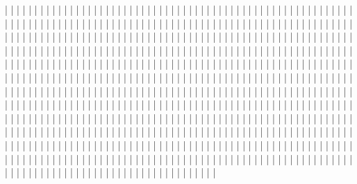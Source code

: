 |    |
|    |
|    |
|    |
|    |
|    |
|    |
|    |
|    |
|    |
|    |
|    |
|    |
|    |
|    |
|    |
|    |
|    |
|    |
|    |
|    |
|    |
|    |
|    |
|    |
|    |
|    |
|    |
|    |
|    |
|    |
|    |
|    |
|    |
|    |
|    |
|    |
|    |
|    |
|    |
|    |
|    |
|    |
|    |
|    |
|    |
|    |
|    |
|    |
|    |
|    |
|    |
|    |
|    |
|    |
|    |
|    |
|    |
|    |
|    |
|    |
|    |
|    |
|    |
|    |
|    |
|    |
|    |
|    |
|    |
|    |
|    |
|    |
|    |
|    |
|    |
|    |
|    |
|    |
|    |
|    |
|    |
|    |
|    |
|    |
|    |
|    |
|    |
|    |
|    |
|    |
|    |
|    |
|    |
|    |
|    |
|    |
|    |
|    |
|    |
|    |
|    |
|    |
|    |
|    |
|    |
|    |
|    |
|    |
|    |
|    |
|    |
|    |
|    |
|    |
|    |
|    |
|    |
|    |
|    |
|    |
|    |
|    |
|    |
|    |
|    |
|    |
|    |
|    |
|    |
|    |
|    |
|    |
|    |
|    |
|    |
|    |
|    |
|    |
|    |
|    |
|    |
|    |
|    |
|    |
|    |
|    |
|    |
|    |
|    |
|    |
|    |
|    |
|    |
|    |
|    |
|    |
|    |
|    |
|    |
|    |
|    |
|    |
|    |
|    |
|    |
|    |
|    |
|    |
|    |
|    |
|    |
|    |
|    |
|    |
|    |
|    |
|    |
|    |
|    |
|    |
|    |
|    |
|    |
|    |
|    |
|    |
|    |
|    |
|    |
|    |
|    |
|    |
|    |
|    |
|    |
|    |
|    |
|    |
|    |
|    |
|    |
|    |
|    |
|    |
|    |
|    |
|    |
|    |
|    |
|    |
|    |
|    |
|    |
|    |
|    |
|    |
|    |
|    |
|    |
|    |
|    |
|    |
|    |
|    |
|    |
|    |
|    |
|    |
|    |
|    |
|    |
|    |
|    |
|    |
|    |
|    |
|    |
|    |
|    |
|    |
|    |
|    |
|    |
|    |
|    |
|    |
|    |
|    |
|    |
|    |
|    |
|    |
|    |
|    |
|    |
|    |
|    |
|    |
|    |
|    |
|    |
|    |
|    |
|    |
|    |
|    |
|    |
|    |
|    |
|    |
|    |
|    |
|    |
|    |
|    |
|    |
|    |
|    |
|    |
|    |
|    |
|    |
|    |
|    |
|    |
|    |
|    |
|    |
|    |
|    |
|    |
|    |
|    |
|    |
|    |
|    |
|    |
|    |
|    |
|    |
|    |
|    |
|    |
|    |
|    |
|    |
|    |
|    |
|    |
|    |
|    |
|    |
|    |
|    |
|    |
|    |
|    |
|    |
|    |
|    |
|    |
|    |
|    |
|    |
|    |
|    |
|    |
|    |
|    |
|    |
|    |
|    |
|    |
|    |
|    |
|    |
|    |
|    |
|    |
|    |
|    |
|    |
|    |
|    |
|    |
|    |
|    |
|    |
|    |
|    |
|    |
|    |
|    |
|    |
|    |
|    |
|    |
|    |
|    |
|    |
|    |
|    |
|    |
|    |
|    |
|    |
|    |
|    |
|    |
|    |
|    |
